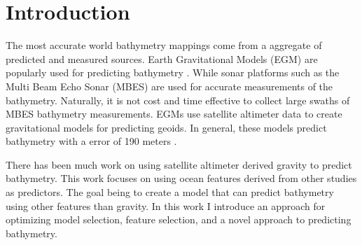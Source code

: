 
\section{Introduction}
\setlength{\parindent}{10ex}
The most accurate world bathymetry mappings come from a aggregate of predicted and measured sources. 
Earth Gravitational Models (EGM) are popularly used for predicting bathymetry \cite{becker2009global}\cite{smith1994bathymetric}\cite{smith1997global}\cite{smith2010planning}.
While sonar platforms such as the Multi Beam Echo Sonar (MBES) \cite{farr1980multibeam} are used for accurate measurements of the bathymetry.
Naturally, it is not cost and time effective to collect large swaths of MBES bathymetry measurements.
EGMs use satellite altimeter data to create gravitational models for predicting geoids.
In general, these models predict bathymetry with a error of 190 meters \cite{jena2012prediction}.

\par
There has been much work on using satellite altimeter derived gravity to predict bathymetry.
This work focuses on using ocean features derived from other studies as predictors.
The goal being to create a model that can predict bathymetry using other features than gravity.
In this work I introduce an approach for optimizing model selection, feature selection, and a novel approach to predicting bathymetry.